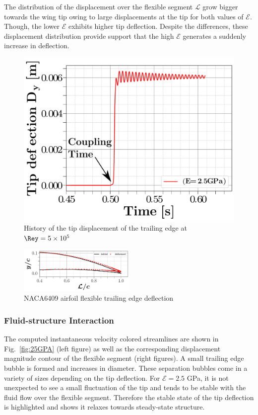 The distribution of the displacement over the flexible segment $\mathcal{L}$ grow bigger towards the wing tip owing to large displacements at the tip for both values of $\mathcal{E}$.
%
Though, the lower $\mathcal{E}$ exhibits higher tip deflection.
%
Despite the differences, these displacement distribution provide support that the high $\mathcal{E}$ generates a suddenly increase in deflection.


\begin{figure}[ht!]
\centering

\includegraphics[width=0.5\columnwidth]{figs/deflectionvariousYoungs0.pdf}
\caption{ History of the tip displacement of the trailing edge at $\Rey =5\times10^5$ }
\label{fig:youngEffect}
\end{figure}

%
\begin{figure}[ht!]
\centering
\includegraphics[width=0.50\textwidth]{figs/naca6409_deformed.pdf}
\caption{NACA6409 airfoil flexible trailing edge deflection}
\label{fig:airfoilSegments} 
\end{figure}
%

%




%


\subsubsection{Fluid-structure Interaction}
\label{sec:fluidStrucutreRespnseToYoungAndRey}

The computed instantaneous velocity colored streamlines are shown in Fig.~\ref{fig:25GPA} (left figure)  as well as the corresponding displacement magnitude contour of the flexible segment (right figures).
%
A small trailing edge bubble is formed and increases in diameter.
%
These separation bubbles come in a variety of sizes depending on the tip deflection.
%
For $\mathcal{E}=2.5$ GPa, it is not unexpected to see a small fluctuation of the tip and tends to be stable with the fluid flow over the flexible segment. Therefore the stable state of the tip deflection is highlighted and shows it relaxes towards steady-state structure.

